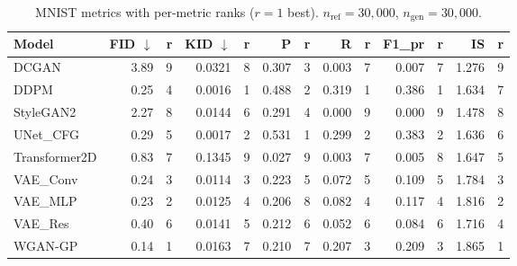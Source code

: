 \begin{table}[H]
\centering
\small
\caption{MNIST metrics with per-metric ranks ($r{=}1$ best). $n_{\text{ref}}{=}30{,}000$, $n_{\text{gen}}{=}30{,}000$.}
\label{tab:mnist-ranked}
\begin{tabular}{lrrrrrrrrrrrr}
\toprule
\textbf{Model} & \textbf{FID} $\downarrow$ & \textbf{r} & \textbf{KID} $\downarrow$ & \textbf{r} & \textbf{P} & \textbf{r} & \textbf{R} & \textbf{r} & \textbf{F1\_pr} & \textbf{r} & \textbf{IS} & \textbf{r} \\
\midrule
DCGAN         & 3.89 & 9 & 0.0321 & 8 & 0.307 & 3 & 0.003 & 7 & 0.007 & 7 & 1.276 & 9 \\
DDPM          & 0.25 & 4 & 0.0016 & 1 & 0.488 & 2 & 0.319 & 1 & 0.386 & 1 & 1.634 & 7 \\
StyleGAN2     & 2.27 & 8 & 0.0144 & 6 & 0.291 & 4 & 0.000 & 9 & 0.000 & 9 & 1.478 & 8 \\
UNet\_CFG     & 0.29 & 5 & 0.0017 & 2 & 0.531 & 1 & 0.299 & 2 & 0.383 & 2 & 1.636 & 6 \\
Transformer2D & 0.83 & 7 & 0.1345 & 9 & 0.027 & 9 & 0.003 & 7 & 0.005 & 8 & 1.647 & 5 \\
VAE\_Conv     & 0.24 & 3 & 0.0114 & 3 & 0.223 & 5 & 0.072 & 5 & 0.109 & 5 & 1.784 & 3 \\
VAE\_MLP      & 0.23 & 2 & 0.0125 & 4 & 0.206 & 8 & 0.082 & 4 & 0.117 & 4 & 1.816 & 2 \\
VAE\_Res      & 0.40 & 6 & 0.0141 & 5 & 0.212 & 6 & 0.052 & 6 & 0.084 & 6 & 1.716 & 4 \\
WGAN-GP        & 0.14 & 1 & 0.0163 & 7 & 0.210 & 7 & 0.207 & 3 & 0.209 & 3 & 1.865 & 1 \\
\bottomrule
\end{tabular}
\end{table}

